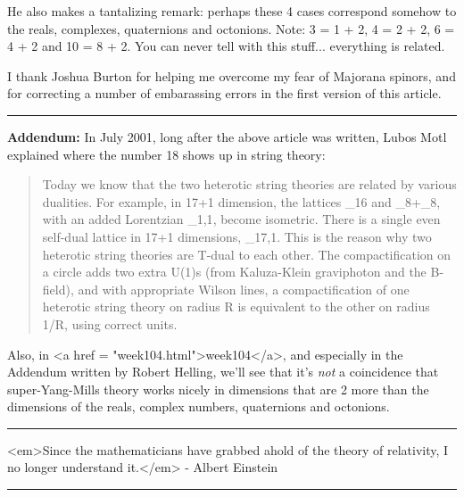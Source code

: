He also makes a tantalizing remark: perhaps these 4 cases correspond
somehow to the reals, complexes, quaternions and octonions.  Note:
3 = 1 + 2, 4 = 2 + 2, 6 = 4 + 2 and 10 = 8 + 2.  You can never tell
with this stuff... everything is related.

I thank Joshua Burton for helping me overcome my fear of Majorana
spinors, and for correcting a number of embarassing errors in the
first version of this article.

\par\noindent\rule{\textwidth}{0.4pt}
\textbf{Addendum:} In July 2001, long after the above article was written,
Lubos Motl explained where the number 18 shows up in string theory:


\begin{quote}
Today we know that the two heterotic string theories are related by
various dualities. For example, in 17+1 dimension, the lattices 
\Gamma _{16} and \Gamma _{8}+\Gamma _{8}, 
with an added Lorentzian \Gamma _{1,1}, become
isometric. There is a single even self-dual lattice in 17+1 dimensions,
\Gamma _{17,1}. This is the reason why two heterotic string theories 
are T-dual to each other. The compactification on a circle adds two extra
U(1)s (from Kaluza-Klein graviphoton and the B-field), and with
appropriate Wilson lines, a compactification of one heterotic string
theory on radius R is equivalent to the other on radius 1/R, using 
correct units.
\end{quote}


Also, in <a href = "week104.html">week104</a>, and especially in the 
Addendum written by Robert Helling, we'll see that it's \emph{not}
a coincidence that super-Yang-Mills theory works nicely in dimensions 
that are 2 more than the dimensions of the reals, complex numbers,
quaternions and octonions.  

\par\noindent\rule{\textwidth}{0.4pt}
<em>Since the mathematicians have grabbed ahold of the theory of relativity,
I no longer understand it.</em> - Albert Einstein


\par\noindent\rule{\textwidth}{0.4pt}

